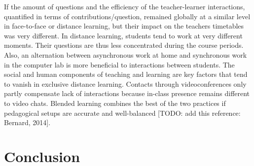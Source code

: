 \documentclass{aims}
\theoremstyle{definition}
\begin{document}
If the amount of questions and the efficiency of the teacher-learner
interactions, quantified in terms of contributions/question, remained
globally at a similar level in face-to-face or distance learning, but
their impact on the teachers timetables was very different. In distance
learning, students tend to work at very different moments. Their
questions are thus less concentrated during the course periods. Also, an
alternation between asynchronous work at home and synchronous work in
the computer lab is more beneficial to interactions between students.
The social and human components of teaching and learning are key factors
that tend to vanish in exclusive distance learning. Contacts through
videoconferences only partly compensate lack of interactions because
in-class presence remains different to video chats. Blended learning
combines the best of the two practices if pedagogical setups are
accurate and well-balanced {[}TODO: add this reference: Bernard,
2014{]}.

\hypertarget{conclusion}{%
\section{Conclusion}\label{conclusion}}
\end{document}
